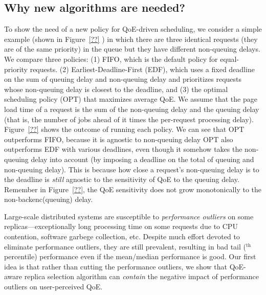 \subsection{Why new algorithms are needed?}

To show the need of a new policy for QoE-driven  scheduling, we consider a simple example (shown in Figure~\ref{??} ) in which there are three identical requests (\ie they are of the same priority) in the queue but they have different non-queuing delays.
We compare three policies: 
(1) FIFO, which is the default policy for equal-priority requests.
(2) Earliest-Deadline-First (EDF), which uses a fixed deadline on the sum of queuing delay and non-queuing delay and prioritizes requests whose non-queuing delay is closest to the deadline, and 
(3) the optimal scheduling policy (OPT) that maximizes average QoE.
We assume that the page load time of a request is the sum of the non-queuing delay and the queuing delay (that is, the number of jobs ahead of it times the per-request processing delay).
Figure~\ref{??}  shows the outcome of running each policy. 
We can see that OPT outperforms FIFO, because it is agnostic to non-queuing delay
OPT also outperforms EDF with various deadlines, even though it somehow takes the non-queuing delay into account (by imposing a deadline on the total of queuing and non-queuing delay).
This is because how close a request's non-queuing delay is to the deadline is {\em still} agnostic to the sensitivity of QoE to the queuing delay. 
Remember in Figure~\ref{??}, the QoE sensitivity does not grow monotonically to the non-backenc(queuing) delay. 

Large-scale distributed systems are susceptible to {\em performance outliers} on some replicas---\eg exceptionally long processing time on some requests due to CPU contention, software garbege collection, etc. 
Despite much effort devoted to eliminate performance outliers, they are still prevalent, resulting in bad tail ($^\textrm{th}$ percentile) performance even if the mean/median performance is good.
Our first idea is that rather than cutting the performance outliers, we show that QoE-aware replica selection algorithm can {\em contain} the negative impact of performance outliers on user-perceived QoE.


